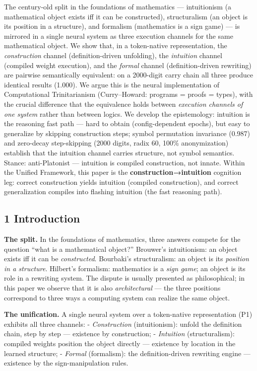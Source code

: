\documentclass[
]{article}
\begin{document}
The century-old split in the foundations of mathematics --- intuitionism
(a mathematical object exists iff it can be constructed), structuralism
(an object is its position in a structure), and formalism (mathematics
is a sign game) --- is mirrored in a single neural system as three
execution channels for the same mathematical object. We show that, in a
token-native representation, the \emph{construction} channel
(definition-driven unfolding), the \emph{intuition} channel (compiled
weight execution), and the \emph{formal} channel (definition-driven
rewriting) are pairwise semantically equivalent: on a 2000-digit carry
chain all three produce identical results (1.000). We argue this is the
neural implementation of Computational Trinitarianism (Curry--Howard:
programs = proofs = types), with the crucial difference that the
equivalence holds between \emph{execution channels of one system} rather
than between logics. We develop the epistemology: intuition is the
reasoning fast path --- hard to obtain (config-dependent epochs), but
easy to generalize by skipping construction steps; symbol permutation
invariance (0.987) and zero-decay step-skipping (2000 digits, radix 60,
100\% anonymization) establish that the intuition channel carries
structure, not symbol semantics. Stance: anti-Platonist --- intuition is
compiled construction, not innate. Within the Unified Framework, this
paper is the \textbf{construction→intuition} cognition leg: correct
construction yields intuition (compiled construction), and correct
generalization compiles into flashing intuition (the fast reasoning
path).

\subsection{1 Introduction}\label{introduction}

\textbf{The split.} In the foundations of mathematics, three answers
compete for the question ``what is a mathematical object?'' Brouwer's
intuitionism: an object exists iff it can be \emph{constructed}.
Bourbaki's structuralism: an object is its \emph{position in a
structure}. Hilbert's formalism: mathematics is a \emph{sign game}; an
object is its role in a rewriting system. The dispute is usually
presented as philosophical; in this paper we observe that it is also
\emph{architectural} --- the three positions correspond to three ways a
computing system can realize the same object.

\textbf{The unification.} A single neural system over a token-native
representation (P1) exhibits all three channels: - \emph{Construction}
(intuitionism): unfold the definition chain, step by step --- existence
by construction; - \emph{Intuition} (structuralism): compiled weights
position the object directly --- existence by location in the learned
structure; - \emph{Formal} (formalism): the definition-driven rewriting
engine --- existence by the sign-manipulation rules.
\end{document}
